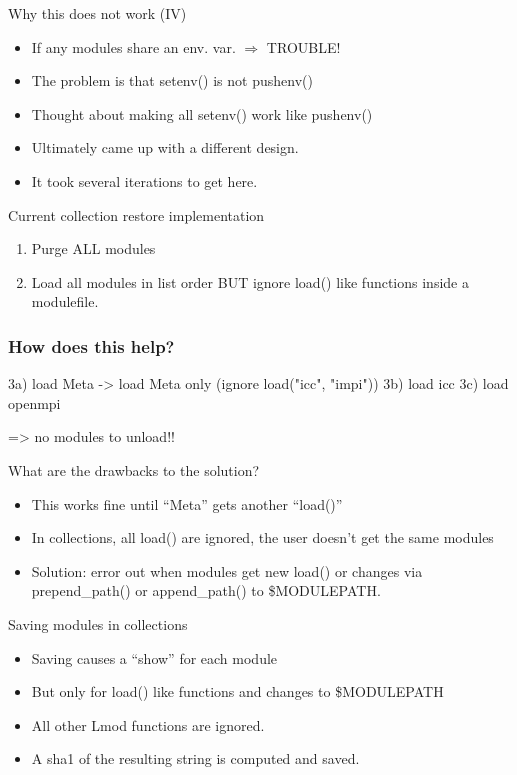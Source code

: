 \documentclass{beamer}
\begin{document}
\begin{frame}{Why this does not work (IV)}
  \begin{itemize}
    \item If any modules share an env. var. $\Rightarrow$ TROUBLE!
    \item The problem is that setenv() is not pushenv()
    \item Thought about making all setenv() work like pushenv()
    \item Ultimately came up with a different design. 
    \item It took several iterations to get here.
  \end{itemize}
\end{frame}

\begin{frame}{Current collection restore implementation}
  \begin{enumerate}
    \item Purge ALL modules
    \item Load all modules in list order BUT ignore load() like
      functions inside a modulefile.
  \end{enumerate}
\end{frame}

\begin{frame}[fragile]
  \frametitle{How does this help?}
    {\small
\begin{semiverbatim}
   
3a) load Meta
    -> load Meta only (ignore load("icc", "impi"))
3b) load icc
3c) load openmpi

=> no modules to unload!!
\end{semiverbatim}
    }
\end{frame}

\begin{frame}{What are the drawbacks to the solution?}
  \begin{itemize}
    \item This works fine until ``Meta'' gets another ``load()''
    \item In collections, all load() are ignored,
      the user doesn't get the same modules
    \item Solution: error out when modules get new load() or changes
      via prepend\_path() or append\_path() to \$MODULEPATH.
  \end{itemize}
\end{frame}

\begin{frame}{Saving modules in collections}
  \begin{itemize}
    \item Saving causes a ``show'' for each module
    \item But only for load() like functions and changes to \$MODULEPATH
    \item All other Lmod functions are ignored. 
    \item A sha1 of the resulting string is computed and saved.
  \end{itemize}
\end{frame}
\end{document}
